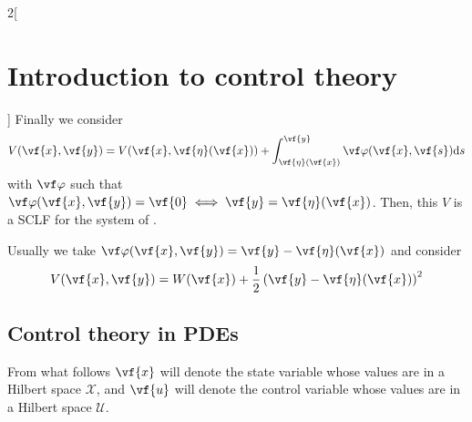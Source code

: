 \documentclass[../../../main_math.tex]{subfiles}
\begin{document}
\begin{multicols}{2}[\section{Introduction to control theory}]
  Finally we consider $$
    V(\vf{x}, \vf{y}) = V(\vf{x}, \vf{\eta}(\vf{x})) +\int_{\vf{\eta}(\vf{x})}^{\vf{y}}\vf\varphi(\vf{x}, \vf{s})\dd s
  $$
  with $\vf\varphi$ such that $\vf\varphi(\vf{x}, \vf{y}) = \vf{0}\iff \vf{y} = \vf{\eta}(\vf{x})$. Then, this $V$ is a SCLF for the system of .
  \begin{remark}
    Usually we take $\vf\varphi(\vf{x}, \vf{y}) = \vf{y}-\vf{\eta}(\vf{x})$ and consider
    $$
      V(\vf{x}, \vf{y}) = W(\vf{x}) + \frac{1}{2}\left(\vf{y}-\vf{\eta}(\vf{x})\right)^2
    $$
  \end{remark}
  \subsection{Control theory in PDEs}
  From what follows $\vf{x}$ will denote the state variable whose values are in a Hilbert space $\mathcal{X}$, and $\vf{u}$ will denote the control variable whose values are in a Hilbert space $\mathcal{U}$.

\end{multicols}
\end{document}
